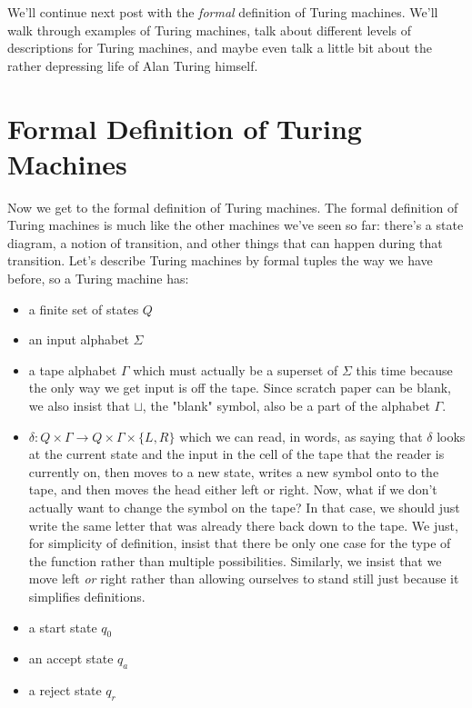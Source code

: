 \documentclass[11pt]{article}
\begin{document}
We'll continue next post with the \emph{formal} definition of Turing machines. We'll walk through examples of Turing machines, talk about different levels of descriptions for Turing machines, and maybe even talk a little bit about the rather depressing life of Alan Turing himself. 
\section{Formal Definition of Turing Machines}
\label{sec-10}
Now we get to the formal definition of Turing machines. The formal definition of Turing machines is much like the other machines we've seen so far: there's a state diagram, a notion of transition, and other things that can happen during that transition. Let's describe Turing machines by formal tuples the way we have before, so a Turing machine has:

\begin{itemize}
\item a finite set of states $Q$
\item an input alphabet $\Sigma$
\item a tape alphabet $\Gamma$ which must actually be a superset of $\Sigma$ this time because the only way we get input is off the tape. Since scratch paper can be blank, we also insist that $\sqcup$, the "blank" symbol, also be a part of the alphabet $\Gamma$.
\item $\delta : Q \times \Gamma \to Q \times \Gamma \times \{L,R\}$ which we can read, in words, as saying that $\delta$ looks at the current state and the input in the cell of the tape that the reader is currently on, then moves to a new state, writes a new symbol onto to the tape, and then moves the head either left or right. Now, what if we don't actually want to change the symbol on the tape? In that case, we should just write the same letter that was already there back down to the tape. We just, for simplicity of definition, insist that there be only one case for the type of the function rather than multiple possibilities. Similarly, we insist that we move left \emph{or} right rather than allowing ourselves to stand still just because it simplifies definitions.
\item a start state $q_0$
\item an accept state $q_a$
\item a reject state $q_r$
\end{itemize}
\end{document}
